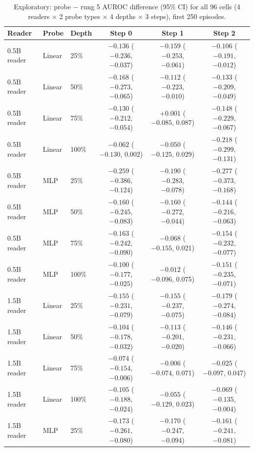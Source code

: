 \begin{table}[htbp]
\centering\scriptsize
\setlength{\tabcolsep}{3pt}
\caption{Exploratory: probe $-$ rung 5 AUROC difference (95\% CI) for all 96 cells (4 readers $\times$ 2 probe types $\times$ 4 depths $\times$ 3 steps), first 250 episodes.}\label{tab:a9}
\begin{tabular}{@{}lllccc@{}}
\toprule
Reader & Probe & Depth & Step 0 & Step 1 & Step 2 \\
\midrule
0.5B reader & Linear & 25\% & $-0.136$ ($-0.236$, $-0.037$) & $-0.159$ ($-0.253$, $-0.061$) & $-0.106$ ($-0.191$, $-0.012$) \\
0.5B reader & Linear & 50\% & $-0.168$ ($-0.273$, $-0.065$) & $-0.112$ ($-0.223$, $-0.010$) & $-0.133$ ($-0.209$, $-0.049$) \\
0.5B reader & Linear & 75\% & $-0.130$ ($-0.212$, $-0.054$) & $+0.001$ ($-0.085$, 0.087) & $-0.148$ ($-0.229$, $-0.067$) \\
0.5B reader & Linear & 100\% & $-0.062$ ($-0.130$, 0.002) & $-0.050$ ($-0.125$, 0.029) & $-0.218$ ($-0.299$, $-0.131$) \\
0.5B reader & MLP & 25\% & $-0.259$ ($-0.386$, $-0.124$) & $-0.190$ ($-0.283$, $-0.078$) & $-0.277$ ($-0.373$, $-0.168$) \\
0.5B reader & MLP & 50\% & $-0.160$ ($-0.245$, $-0.083$) & $-0.160$ ($-0.272$, $-0.044$) & $-0.144$ ($-0.216$, $-0.063$) \\
0.5B reader & MLP & 75\% & $-0.163$ ($-0.242$, $-0.090$) & $-0.068$ ($-0.155$, 0.021) & $-0.154$ ($-0.232$, $-0.077$) \\
0.5B reader & MLP & 100\% & $-0.100$ ($-0.177$, $-0.025$) & $-0.012$ ($-0.096$, 0.075) & $-0.151$ ($-0.235$, $-0.071$) \\
1.5B reader & Linear & 25\% & $-0.155$ ($-0.231$, $-0.079$) & $-0.155$ ($-0.237$, $-0.075$) & $-0.179$ ($-0.274$, $-0.084$) \\
1.5B reader & Linear & 50\% & $-0.104$ ($-0.178$, $-0.032$) & $-0.113$ ($-0.201$, $-0.020$) & $-0.146$ ($-0.231$, $-0.066$) \\
1.5B reader & Linear & 75\% & $-0.074$ ($-0.154$, $-0.006$) & $-0.006$ ($-0.074$, 0.071) & $-0.025$ ($-0.097$, 0.047) \\
1.5B reader & Linear & 100\% & $-0.105$ ($-0.188$, $-0.024$) & $-0.055$ ($-0.129$, 0.023) & $-0.069$ ($-0.135$, $-0.004$) \\
1.5B reader & MLP & 25\% & $-0.173$ ($-0.261$, $-0.080$) & $-0.170$ ($-0.247$, $-0.094$) & $-0.161$ ($-0.241$, $-0.081$) \\

\end{tabular}
\end{table}
